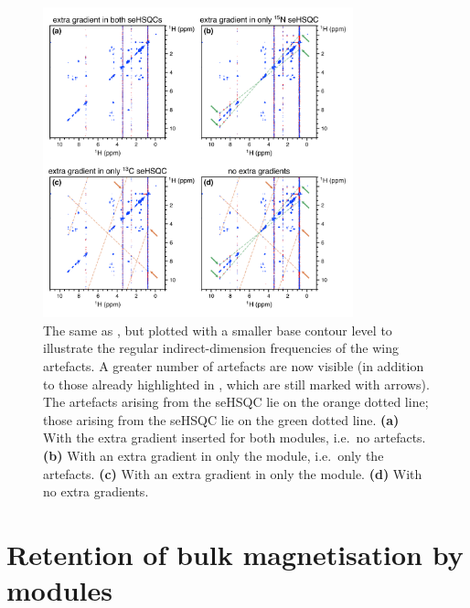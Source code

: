 \begin{figure}
    \centering
    \includegraphics[width=0.8\textwidth]{./figures/wing_artefacts2.png}
    \caption{
        The same as , but plotted with a smaller base contour level to illustrate the regular indirect-dimension frequencies of the wing artefacts.
        A greater number of artefacts are now visible (in addition to those already highlighted in , which are still marked with arrows).
        The artefacts arising from the \nitrogen{} seHSQC lie on the orange dotted line; those arising from the \carbon{} seHSQC lie on the green dotted line.
        \textbf{(a)} With the extra gradient inserted for both modules, i.e.\ no artefacts.
        \textbf{(b)} With an extra gradient in only the \nitrogen{} module, i.e.\ only the \carbon{} artefacts.
        \textbf{(c)} With an extra gradient in only the \carbon{} module.
        \textbf{(d)} With no extra gradients.
        \grami{}
    }
    \label{fig:wing_artefacts2}
\end{figure}

\section{Retention of bulk magnetisation by \texorpdfstring{\nitrogen{}}{15N} modules}

